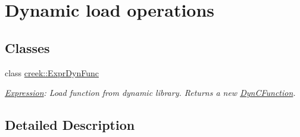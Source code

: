 \hypertarget{group__expression__dyn__load}{}\section{Dynamic load operations}
\label{group__expression__dyn__load}
\subsection*{Classes}
\begin{DoxyCompactItemize}
\item 
class \hyperlink{classcreek_1_1_expr_dyn_func}{creek\+::\+Expr\+Dyn\+Func}
\begin{DoxyCompactList}\small\item\em \hyperlink{classcreek_1_1_expression}{Expression}\+: Load function from dynamic library. Returns a new {\ttfamily \hyperlink{classcreek_1_1_dyn_c_function}{Dyn\+C\+Function}}. \end{DoxyCompactList}\end{DoxyCompactItemize}


\subsection{Detailed Description}
